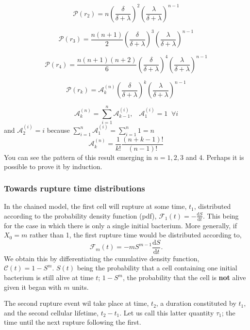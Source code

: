 $$\mathcal{P}(r_2) = n\left(\frac{\delta}{\delta + \lambda}\right)^{2} \left(\frac{\lambda}{\delta + \lambda}\right)^{n-1}$$

$$\mathcal{P}(r_3) = \frac{n(n+1)}{2}\left(\frac{\delta}{\delta + \lambda}\right)^{3} \left(\frac{\lambda}{\delta + \lambda}\right)^{n-1}$$

$$\mathcal{P}(r_4) = \frac{n(n+1)(n+2)}{6}\left(\frac{\delta}{\delta + \lambda}\right)^{4} \left(\frac{\lambda}{\delta + \lambda}\right)^{n-1}$$


$$\mathcal{P}(r_k) = \mathcal{A}^{(n)}_{k}\left(\frac{\delta}{\delta + \lambda}\right)^{k} \left(\frac{\lambda}{\delta + \lambda}\right)^{n-1}$$


$$\mathcal{A}^{(n)}_{k} = \sum^{n}_{i=1}\mathcal{A}^{(i)}_{k-1}, \hspace{10pt} \mathcal{A}^{(i)}_{1} = 1 \;\; \forall i $$
 and  $\mathcal{A}^{(i)}_2 = i$ because $\sum_{i=1}^n \mathcal{A}_1^{(i)}= \sum_{i=1}^n 1 = n$
$$\mathcal{A}^{(n)}_{k} =  \frac{1}{k!}\frac{(n+k-1)!}{(n-1)!}$$
You can see the pattern of this result emerging in $n=1,2,3$ and 4. Perhaps it is possible to prove it by induction.


\vspace{20pt}

\subsubsection*{Towards rupture time distributions}

In the chained model, the first cell will rupture at some time, $t_1$, distributed according to the probability density function (pdf), $\mathcal{F}_{1}(t) = -\frac{\mathrm{d}S}{\mathrm{d}t}$. This being for the case in which there is only a single initial bacterium. More generally, if $X_0 = m$ rather than 1, the first rupture time would be distributed according to,
$$\mathcal{F}_{m}(t) = -mS^{m-1}\frac{\mathrm{d}S}{\mathrm{d}t}.$$
We obtain this by differentiating the cumulative density function, $\mathcal{C}(t) = 1 - S^m$. $S(t)$ being the probability that a cell containing one initial bacterium is still alive at time $t$;  $1 - S^m$, the probability that the cell is \textbf{not} alive given it began with $m$ units.\par

The second rupture event wil take place at time, $t_2$, a duration constituted by $t_1$, and the second cellular lifetime, $t_2 - t_1$. Let us call this latter quantity $\tau_1$; the time until the next rupture following the first. \par















